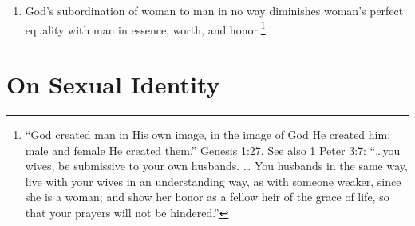 \documentclass[
]{book}
\begin{document}
\begin{enumerate}
\item
  God's subordination of woman to man in no way diminishes woman's perfect equality with man in essence, worth, and honor.\footnote{``God created man in His own image, in the image of God He created him; male and female He created them.'' Genesis 1:27. See also 1 Peter 3:7: ``\ldots you wives, be submissive to your own husbands. \ldots{} You husbands in the same way, live with your wives in an understanding way, as with someone weaker, since she is a woman; and show her honor as a fellow heir of the grace of life, so that your prayers will not be hindered.''}
\end{enumerate}

\hypertarget{on-sexual-identity}{%
\section*{On Sexual Identity}\label{on-sexual-identity}}
\end{document}

